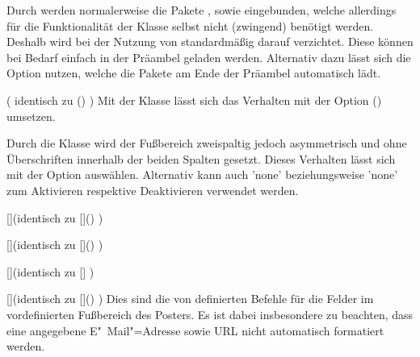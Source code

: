\begin{Entity*}{}
\begin{Declaration}{}
\printdeclarationlist%
%
Durch  werden normalerweise die Pakete , 
 sowie  eingebunden, welche allerdings für 
die Funktionalität der Klasse selbst nicht (zwingend) benötigt werden. Deshalb 
wird bei der Nutzung von  standardmäßig darauf verzichtet. 
Diese können bei Bedarf einfach in der Präambel geladen werden. Alternativ 
dazu 
lässt sich die Option  nutzen, welche die Pakete am Ende 
der Präambel automatisch lädt.
\end{Declaration}

\begin{Declaration}{}(%
  identisch zu ()%
)
\printdeclarationlist%
%
Mit der Klasse  lässt sich das Verhalten mit der Option 
() umsetzen.
\end{Declaration}

\begin{Declaration}{}%
\printdeclarationlist%
%
Durch die Klasse  wird der Fußbereich zweispaltig jedoch 
asymmetrisch und ohne Überschriften innerhalb der beiden Spalten gesetzt. 
Dieses Verhalten lässt sich mit der Option  auswählen. 
Alternativ kann auch 'none' beziehungsweise 
'none' zum Aktivieren respektive Deaktivieren 
verwendet werden.
\end{Declaration}

\begin{Declaration}{[]}(identisch zu 
  []()%
)
\begin{Declaration}{[]}(identisch zu 
  []()%
)
\begin{Declaration}{[]}(identisch zu 
  []%
)
\begin{Declaration}{[]}(identisch zu 
  []()%
)
\printdeclarationlist%
%
Dies sind die von  definierten Befehle für die Felder im 
vordefinierten Fußbereich des Posters. Es ist dabei insbesondere zu beachten, 
dass eine angegebene E"~Mail"=Adresse sowie URL nicht automatisch formatiert 
werden.
\end{Declaration}
\end{Declaration}
\end{Declaration}
\end{Declaration}


\end{Entity*}

